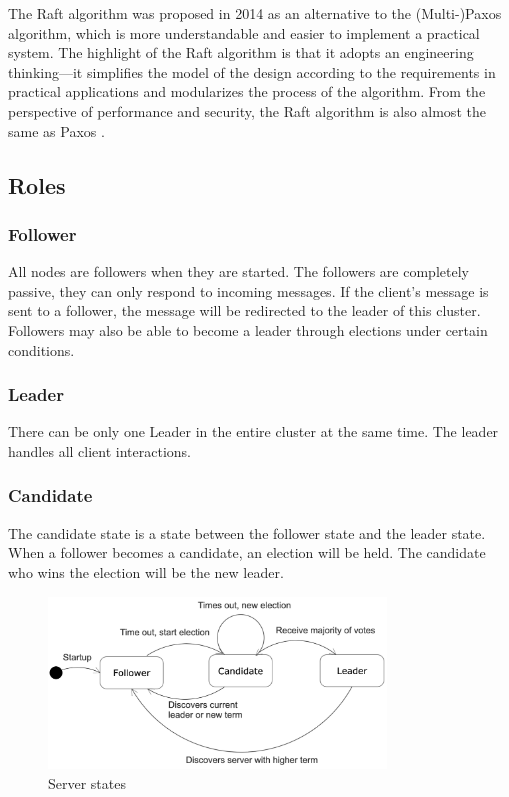 \documentclass[12pt, a4paper]{article}
\begin{document}
The Raft algorithm was proposed in 2014\cite{conf/usenix/OngaroO14} as an alternative to the (Multi-)Paxos algorithm, which is more understandable and easier to implement a practical system. The highlight of the Raft algorithm is that it adopts an engineering thinking---it simplifies the model of the design according to the requirements in practical applications and modularizes the process of the algorithm. From the perspective of performance and security, the Raft algorithm is also almost the same as Paxos \cite{conf/usenix/OngaroO14}.

\subsection{Roles}

  \subsubsection{Follower}
  All nodes are followers when they are started. The followers are completely passive, they can only respond to incoming messages. If the client's message is sent to a follower, the message will be redirected to the leader of this cluster. Followers may also be able to become a leader through elections under certain conditions.

  \subsubsection{Leader}
  There can be only one Leader in the entire cluster at the same time. The leader handles all client interactions.

  \subsubsection{Candidate}
  The candidate state is a state between the follower state and the leader state. When a follower becomes a candidate, an election will be held. The candidate who wins the election will be the new leader.
  \begin{figure}[htp]
      \centering
      \includegraphics[width=0.8\textwidth]{img/raft-state-diagram.png}
      \caption{Server states}
      \label{fig:raft-states}
  \end{figure}
\end{document}
